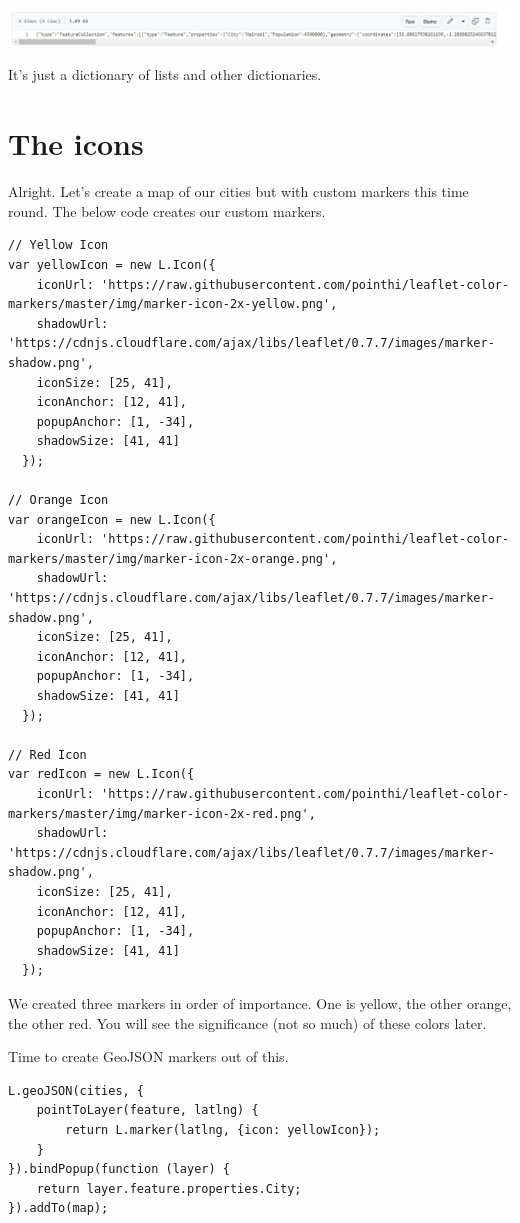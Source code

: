 \documentclass[
]{book}
\begin{document}
\includegraphics[width=21.96in]{../images/geojson-nowebmap}

It's just a dictionary of lists and other dictionaries.

\hypertarget{the-icons}{%
\section{The icons}\label{the-icons}}

Alright. Let's create a map of our cities but with custom markers this time round. The below code creates our custom markers.

\begin{verbatim}
// Yellow Icon
var yellowIcon = new L.Icon({
    iconUrl: 'https://raw.githubusercontent.com/pointhi/leaflet-color-markers/master/img/marker-icon-2x-yellow.png',
    shadowUrl: 'https://cdnjs.cloudflare.com/ajax/libs/leaflet/0.7.7/images/marker-shadow.png',
    iconSize: [25, 41],
    iconAnchor: [12, 41],
    popupAnchor: [1, -34],
    shadowSize: [41, 41]
  });

// Orange Icon
var orangeIcon = new L.Icon({
    iconUrl: 'https://raw.githubusercontent.com/pointhi/leaflet-color-markers/master/img/marker-icon-2x-orange.png',
    shadowUrl: 'https://cdnjs.cloudflare.com/ajax/libs/leaflet/0.7.7/images/marker-shadow.png',
    iconSize: [25, 41],
    iconAnchor: [12, 41],
    popupAnchor: [1, -34],
    shadowSize: [41, 41]
  });

// Red Icon
var redIcon = new L.Icon({
    iconUrl: 'https://raw.githubusercontent.com/pointhi/leaflet-color-markers/master/img/marker-icon-2x-red.png',
    shadowUrl: 'https://cdnjs.cloudflare.com/ajax/libs/leaflet/0.7.7/images/marker-shadow.png',
    iconSize: [25, 41],
    iconAnchor: [12, 41],
    popupAnchor: [1, -34],
    shadowSize: [41, 41]
  });
\end{verbatim}

We created three markers in order of importance. One is yellow, the other orange, the other red. You will see the significance (not so much) of these colors later.

Time to create GeoJSON markers out of this.

\begin{verbatim}
L.geoJSON(cities, {
    pointToLayer(feature, latlng) {
        return L.marker(latlng, {icon: yellowIcon});
    }
}).bindPopup(function (layer) {
    return layer.feature.properties.City;
}).addTo(map);
\end{verbatim}
\end{document}
